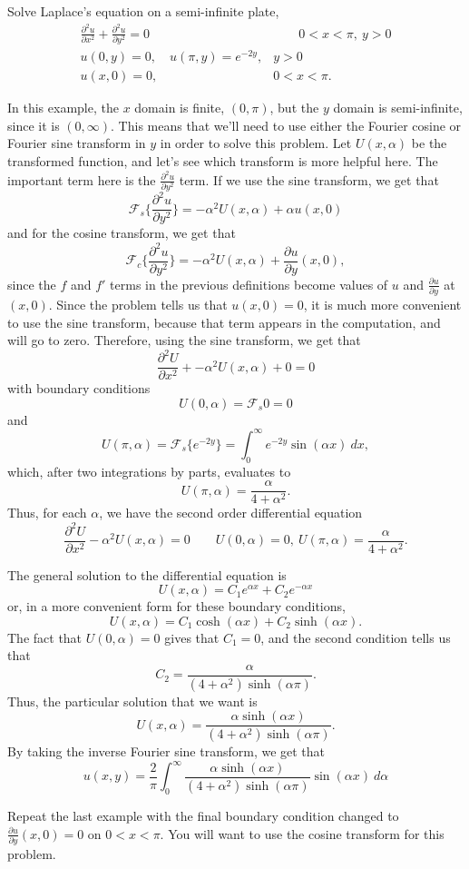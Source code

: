 \documentclass{ximera}
\begin{document}
\begin{example}
    Solve Laplace's equation on a semi-infinite plate,
    \[
        \begin{split}
            \frac{\partial^2 u}{\partial x^2} + \frac{\partial^2 u}{\partial y^2} = 0 & \qquad 0 < x < \pi,\ y > 0 \\
            u(0, y) = 0, \quad u(\pi, y) = e^{-2y}, & y > 0 \\
            u(x, 0) = 0, & 0 < x < \pi. 
        \end{split}
    \]
\end{example}

\begin{exampleSol}
In this example, the $x$ domain is finite, $(0, \pi)$, but the $y$ domain is semi-infinite, since it is $(0, \infty)$. This means that we'll need to use either the Fourier cosine or Fourier sine transform in $y$ in order to solve this problem. Let $U(x, \alpha)$ be the transformed function, and let's see which transform is more helpful here. The important term here is the $\frac{\partial^2 u}{\partial y^2}$ term. If we use the sine transform, we get that
\[ 
    \mathcal{F}_s\{\frac{\partial^2 u}{\partial y^2}\} = -\alpha^2 U(x, \alpha) + \alpha u(x,0) 
\] 
and for the cosine transform, we get that
\[ 
    \mathcal{F}_c\{\frac{\partial^2 u}{\partial y^2}\} = -\alpha^2 U(x, \alpha) +  \frac{\partial u}{\partial y}(x,0), 
\] 
since the $f$ and $f'$ terms in the previous definitions become values of $u$ and $\frac{\partial u}{\partial y}$ at $(x,0)$. Since the problem tells us that $u(x,0) = 0$, it is much more convenient to use the sine transform, because that term appears in the computation, and will go to zero. Therefore, using the sine transform, we get that
\[ 
    \frac{\partial^2 U}{\partial x^2} + -\alpha^2 U(x, \alpha) + 0 = 0 
\] 
with boundary conditions
\[ 
    U(0, \alpha) = \mathcal{F}_s{0} = 0 
\] 
and 
\[ 
    U(\pi, \alpha) = \mathcal{F}_s\{e^{-2y}\} = \int_0^\infty e^{-2y}\sin(\alpha x) \ dx, 
\]
which, after two integrations by parts, evaluates to
\[ 
    U(\pi, \alpha) = \frac{\alpha}{4+\alpha^2}.
\] 
Thus, for each $\alpha$, we have the second order differential equation
\[  
    \frac{\partial^2 U}{\partial x^2}  -\alpha^2 U(x, \alpha) = 0 \qquad U(0, \alpha) = 0,\ U(\pi, \alpha) = \frac{\alpha}{4 + \alpha^2} .
\]

The general solution to the differential equation is
\[ 
    U(x, \alpha) = C_1e^{\alpha x} + C_2 e^{-\alpha x} 
\] 
or, in a more convenient form for these boundary conditions,
\[ 
    U(x, \alpha) = C_1 \cosh(\alpha x) + C_2 \sinh(\alpha x). 
\] 
The fact that $U(0, \alpha) = 0$ gives that $C_1 = 0$, and the second condition tells us that
\[ 
    C_2 = \frac{\alpha}{(4 + \alpha^2)\sinh(\alpha \pi)}. 
\] 
Thus, the particular solution that we want is 
\[ 
    U(x, \alpha) = \frac{\alpha \sinh(\alpha x)}{(4 + \alpha^2)\sinh(\alpha \pi)}. 
\] 
By taking the inverse Fourier sine transform, we get that
\[ 
    u(x,y) = \frac{2}{\pi} \int_0^\infty \frac{\alpha \sinh(\alpha x)}{(4 + \alpha^2)\sinh(\alpha \pi)} \sin(\alpha x)\ d\alpha  
\]
\end{exampleSol}

\begin{exercise}
    Repeat the last example with the final boundary condition changed to $\frac{\partial u}{\partial y}(x, 0) = 0$ on $0 < x < \pi$. You will want to use the cosine transform for this problem.
\end{exercise}
\end{document}
